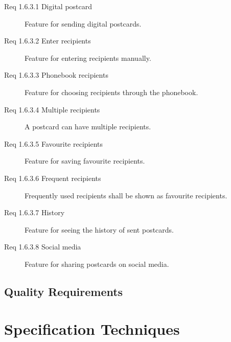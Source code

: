 \documentclass[10pt,a4paper]{article}
\begin{document}
\begin {description}
\item [Req 1.6.3.1 Digital postcard] Feature for sending digital postcards.
\item [Req 1.6.3.2 Enter recipients] Feature for entering recipients manually.
\item [Req 1.6.3.3 Phonebook recipients] Feature for choosing recipients through the phonebook.
\item [Req 1.6.3.4 Multiple recipients] A postcard can have multiple recipients.
\item [Req 1.6.3.5 Favourite recipients] Feature for saving favourite recipients.
\item [Req 1.6.3.6 Frequent recipients] Frequently used recipients shall be shown as favourite recipients.
\item [Req 1.6.3.7 History] Feature for seeing the history of sent postcards.
\item [Req 1.6.3.8 Social media] Feature for sharing postcards on social media.
\end {description}

\subsection{Quality Requirements}








\section{Specification Techniques}
\end{document}
